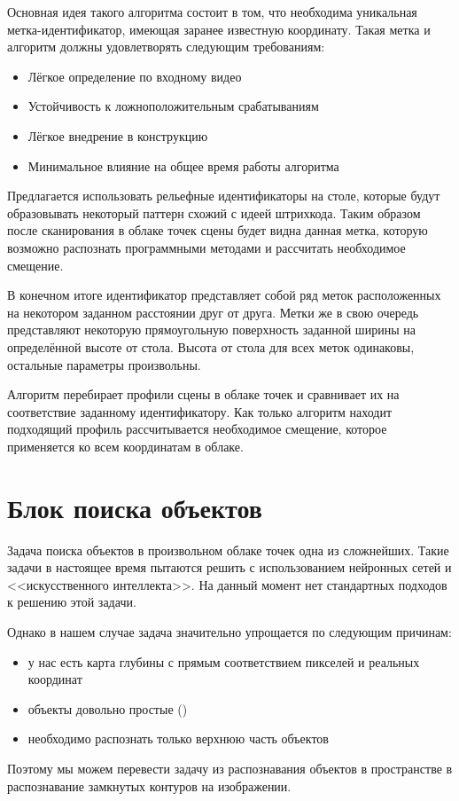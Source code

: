             Основная идея такого алгоритма состоит в том, что необходима уникальная метка-идентификатор, имеющая заранее известную координату. Такая метка и алгоритм должны удовлетворять следующим требованиям:
            \begin{itemize}
                \item Лёгкое определение по входному видео
                \item Устойчивость к ложноположительным срабатываниям
                \item Лёгкое внедрение в конструкцию
                \item Минимальное влияние на общее время работы алгоритма
            \end{itemize}

            Предлагается использовать рельефные идентификаторы на столе, которые будут образовывать некоторый паттерн схожий с идеей штрихкода. Таким образом после сканирования в облаке точек сцены будет видна данная метка, которую возможно распознать программными методами и рассчитать необходимое смещение.
            
            В конечном итоге идентификатор представляет собой ряд меток расположенных на некотором заданном расстоянии друг от друга. Метки же в свою очередь представляют некоторую прямоугольную поверхность заданной ширины на определённой высоте от стола. Высота от стола для всех меток одинаковы, остальные параметры произвольны.
            
            Алгоритм перебирает профили сцены в облаке точек и сравнивает их на соответствие заданному идентификатору. Как только алгоритм находит подходящий профиль рассчитывается необходимое смещение, которое применяется ко всем координатам в облаке.
            
    \section{Блок поиска объектов}
        Задача поиска объектов в произвольном облаке точек одна из сложнейших. Такие задачи в настоящее время пытаются решить с использованием нейронных сетей и <<искусственного интеллекта>>. На данный момент нет стандартных подходов к решению этой задачи.
        
        Однако в нашем случае задача значительно упрощается по следующим причинам:
        \begin{itemize}
            \item у нас есть карта глубины с прямым соответствием пикселей и реальных координат
            \item объекты довольно простые ()
            \item необходимо распознать только верхнюю часть объектов
        \end{itemize}
        Поэтому мы можем перевести задачу из распознавания объектов в пространстве в распознавание замкнутых контуров на изображении.
        

